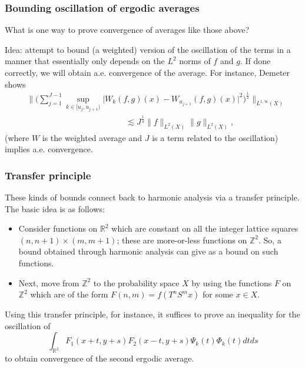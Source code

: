 \documentclass[usenames,dvipsnames,12pt]{beamer}
\begin{document}
\begin{frame}
\frametitle{Bounding oscillation of ergodic averages}
What is one way to prove convergence of averages like those above?
\pause

Idea: attempt to bound (a weighted) version of the oscillation of the terms in a manner that essentially only depends on the $L^2$ norms of $f$ and $g$. If done correctly, we will obtain a.e. convergence of the average. \pause For instance, Demeter shows
\begin{equation*}
\begin{aligned}
    &\Big\| \Big(\sum \limits_{j=1}^{J-1}\sup_{k \in [u_j,u_{j+1})}\vert W_k(f, g)(x) - W_{u_{j+1}}(f, g)(x)\vert^2\Big)^{\frac{1}{2}} \Big\|_{L^{1, \infty}(X)}\\
    &\quad\quad\quad\quad\quad\quad\quad\quad\quad\quad\quad\quad\lesssim J^{\frac{1}{4}}\lVert f\rVert_{L^2(X)} \lVert g\rVert_{L^2(X)},
\end{aligned}
\end{equation*}
(where $W$ is the weighted average and $J$ is a term related to the oscillation) implies a.e. convergence.
\end{frame}


\begin{frame}
\frametitle{Transfer principle}
These kinds of bounds connect back to harmonic analysis via a transfer principle. The basic idea is as follows:\pause
\begin{itemize}
\item Consider functions on $\mathbb{R}^2$ which are constant on all the integer lattice squares $(n, n+1)\times(m, m+1)$; these are more-or-less functions on $\mathbb{Z}^2$. So, a bound obtained through harmonic analysis can give as a bound on such functions. \pause
\item Next, move from $\mathbb{Z}^2$ to the probability space $X$ by using the functions $F$ on $\mathbb{Z}^2$ which are of the form $F(n, m)=f(T^n S^mx)$ for some $x\in X$. \pause
\end{itemize}
Using this transfer principle, for instance, it suffices to prove an inequality for the oscillation of
\begin{equation*}
    \int_{\mathbb{R}^2} F_1(x + t, y + s) F_2(x -t, y+s) \Psi_k(t)\Phi_k(t) dtds
\end{equation*}
to obtain convergence of the second ergodic average.

\end{frame}
\end{document}

